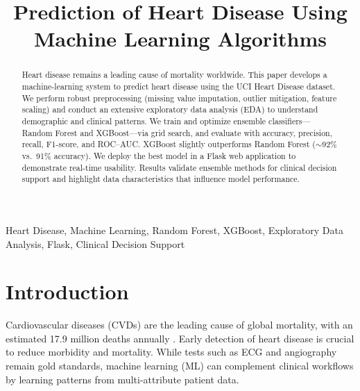 \documentclass[conference]{IEEEtran}
\title{Prediction of Heart Disease Using Machine Learning Algorithms}
\author{
\IEEEauthorblockN{HMRS Samaranayaka}
\IEEEauthorblockA{Department of Computer Science \& Software Engineering\\
NSBM Green University, Homagama, Sri Lanka\\
\texttt{hmrssamaranayaka.students.nsbm.ac.lk}}
}
\begin{document}
\maketitle

\begin{abstract}
Heart disease remains a leading cause of mortality worldwide. This paper develops a machine-learning system to predict heart disease using the UCI Heart Disease dataset. We perform robust preprocessing (missing value imputation, outlier mitigation, feature scaling) and conduct an extensive exploratory data analysis (EDA) to understand demographic and clinical patterns. We train and optimize ensemble classifiers---Random Forest and XGBoost---via grid search, and evaluate with accuracy, precision, recall, F1-score, and ROC--AUC. XGBoost slightly outperforms Random Forest (\(\sim\)92\% vs.\ 91\% accuracy). We deploy the best model in a Flask web application to demonstrate real-time usability. Results validate ensemble methods for clinical decision support and highlight data characteristics that influence model performance.
\end{abstract}

\begin{IEEEkeywords}
Heart Disease, Machine Learning, Random Forest, XGBoost, Exploratory Data Analysis, Flask, Clinical Decision Support
\end{IEEEkeywords}

\section{Introduction}
Cardiovascular diseases (CVDs) are the leading cause of global mortality, with an estimated 17.9 million deaths annually \cite{who2021}. Early detection of heart disease is crucial to reduce morbidity and mortality. While tests such as ECG and angiography remain gold standards, machine learning (ML) can complement clinical workflows by learning patterns from multi-attribute patient data.
\end{document}

